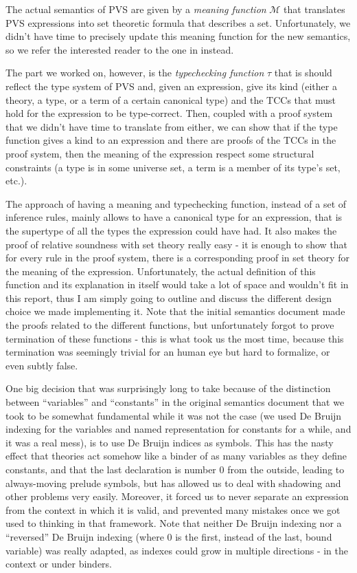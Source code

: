 \documentclass[utf8,a4paper]{article}
\begin{document}
The actual semantics of PVS are given by a \textit{meaning function}
$\mathcal{M}$ that translates PVS expressions into set theoretic
formula that describes a set. Unfortunately, we didn't have time to
precisely update this meaning function for the new semantics, so we
refer the interested reader to the one in \cite{PVS-Semantics:TR}
instead.

The part we worked on, however, is the \textit{typechecking function}
$\tau$ that is should reflect the type system of PVS and, given an
expression, give its kind (either a theory, a type, or a term of a
certain canonical type) and the TCCs that must hold for the expression to be
type-correct. Then, coupled with a proof system that we didn't have
time to translate from \cite{PVS-Semantics:TR} either, we can show
that if the type function gives a kind to an expression and there are
proofs of the TCCs in the proof system, then the meaning of the
expression respect some structural constraints (a type is in some
universe set, a term is a member of its type's set, etc.).

The approach of having a meaning and typechecking function, instead of
a set of inference rules, mainly allows to have a canonical type for
an expression, that is the supertype of all the types the expression
could have had. It also makes the proof of relative soundness with set
theory really easy - it is enough to show that for every rule in the
proof system, there is a corresponding proof in set theory for the
meaning of the expression. Unfortunately, the actual definition of
this function and its explanation in itself would take a lot of space
and wouldn't fit in this report, thus I am simply going to outline and
discuss the different design choice we made implementing it. Note that
the initial semantics document made the proofs related to the
different functions, but unfortunately forgot to prove termination of
these functions - this is what took us the most time, because this
termination was seemingly trivial for an human eye but hard to
formalize, or even subtly false.

One big decision that was surprisingly long to take because of the
distinction between ``variables'' and ``constants'' in the original
semantics document that we took to be somewhat fundamental while it
was not the case (we used De Bruijn indexing for the variables and
named representation for constants for a while, and it was a real
mess), is to use De Bruijn indices as symbols. This has the nasty
effect that theories act somehow like a binder of as many variables as
they define constants, and that the last declaration is number $0$
from the outside, leading to always-moving prelude symbols, but has
allowed us to deal with shadowing and other problems very
easily. Moreover, it forced us to never separate an expression from
the context in which it is valid, and prevented many mistakes once we
got used to thinking in that framework. Note that neither De Bruijn
indexing nor a ``reversed'' De Bruijn indexing (where $0$ is the
first, instead of the last, bound variable) was really adapted, as
indexes could grow in multiple directions - in the context or under
binders.
\end{document}
